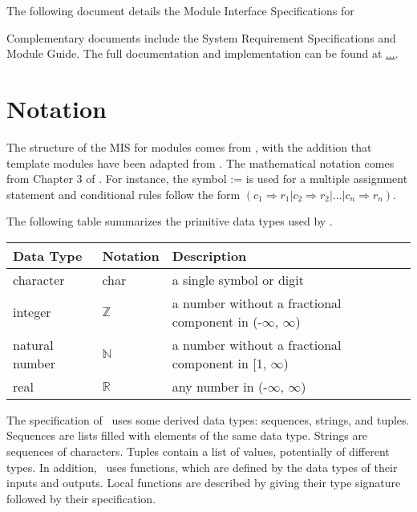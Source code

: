 \documentclass[12pt, titlepage]{article}
\begin{document}
The following document details the Module Interface Specifications for

Complementary documents include the System Requirement Specifications
and Module Guide.  The full documentation and implementation can be
found at \url{...}.  

\section{Notation}


The structure of the MIS for modules comes from \citet{HoffmanAndStrooper1995},
with the addition that template modules have been adapted from
\cite{GhezziEtAl2003}.  The mathematical notation comes from Chapter 3 of
\citet{HoffmanAndStrooper1995}.  For instance, the symbol := is used for a
multiple assignment statement and conditional rules follow the form $(c_1
\Rightarrow r_1 | c_2 \Rightarrow r_2 | ... | c_n \Rightarrow r_n )$.

The following table summarizes the primitive data types used by \progname. 

\begin{center}
\renewcommand{\arraystretch}{1.2}
\noindent 
\begin{tabular}{l l p{7.5cm}} 
\toprule 
\textbf{Data Type} & \textbf{Notation} & \textbf{Description}\\ 
\midrule
character & char & a single symbol or digit\\
integer & $\mathbb{Z}$ & a number without a fractional component in (-$\infty$, $\infty$) \\
natural number & $\mathbb{N}$ & a number without a fractional component in [1, $\infty$) \\
real & $\mathbb{R}$ & any number in (-$\infty$, $\infty$)\\
\bottomrule
\end{tabular} 
\end{center}

\noindent
The specification of \progname \ uses some derived data types: sequences, strings, and
tuples. Sequences are lists filled with elements of the same data type. Strings
are sequences of characters. Tuples contain a list of values, potentially of
different types. In addition, \progname \ uses functions, which
are defined by the data types of their inputs and outputs. Local functions are
described by giving their type signature followed by their specification.
\end{document}
